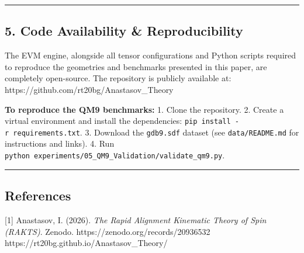 \documentclass[
]{article}
\begin{document}
\begin{center}\rule{0.5\linewidth}{0.5pt}\end{center}

\subsection{5. Code Availability \&
Reproducibility}\label{code-availability-reproducibility}

The EVM engine, alongside all tensor configurations and Python scripts
required to reproduce the geometries and benchmarks presented in this
paper, are completely open-source. The repository is publicly available
at: https://github.com/rt20bg/Anastasov\_Theory

\textbf{To reproduce the QM9 benchmarks:} 1. Clone the repository. 2.
Create a virtual environment and install the dependencies:
\texttt{pip\ install\ -r\ requirements.txt}. 3. Download the
\texttt{gdb9.sdf} dataset (see \texttt{data/README.md} for instructions
and links). 4. Run
\texttt{python\ experiments/05\_QM9\_Validation/validate\_qm9.py}.

\begin{center}\rule{0.5\linewidth}{0.5pt}\end{center}

\subsection{References}\label{references}

{[}1{]} Anastasov, I. (2026). \emph{The Rapid Alignment Kinematic Theory
of Spin (RAKTS)}. Zenodo. https://zenodo.org/records/20936532 \textbar{}
https://rt20bg.github.io/Anastasov\_Theory/
\end{document}

